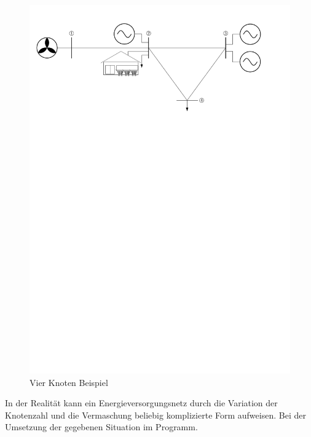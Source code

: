 \begin{figure}[h]
\caption{Vier Knoten Beispiel}
	\label{vkb}
	\begin{center}
	\includegraphics[scale=0.75]{images/SEVN/power_grid}
	\end{center}
\end{figure}

In der Realität kann ein Energieversorgungsnetz durch die Variation der Knotenzahl und die Vermaschung beliebig komplizierte
Form aufweisen. Bei der Umsetzung der gegebenen Situation im Programm.

